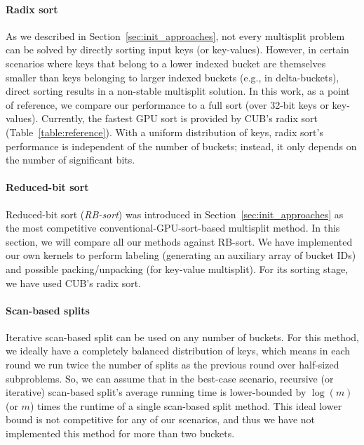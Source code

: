 \paragraph{Radix sort} As we described in Section~\ref{sec:init_approaches}, not every multisplit problem can be solved by directly sorting input keys (or key-values). However, in certain scenarios where keys that belong to a lower indexed bucket are themselves smaller than keys belonging to larger indexed buckets (e.g., in delta-buckets), direct sorting results in a non-stable multisplit solution.
In this work, as a point of reference, we compare our performance to a full sort (over 32-bit keys or key-values).
Currently, the fastest GPU sort is provided by CUB's radix sort (Table~\ref{table:reference}).
With a uniform distribution of keys, radix sort's performance is independent of the number of buckets; instead, it only depends on the number of significant bits.

\paragraph{Reduced-bit sort} Reduced-bit sort (\emph{RB-sort}) was introduced in Section~\ref{sec:init_approaches} as the most competitive conventional-GPU-sort-based multisplit method.
In this section, we will compare all our methods against RB-sort. We have implemented our own kernels to perform labeling (generating an auxiliary array of bucket IDs) and possible packing/unpacking (for key-value multisplit). For its sorting stage, we have used CUB's radix sort.

\paragraph{Scan-based splits}
Iterative scan-based split can be used on any number of buckets. For this method, we ideally have a completely balanced distribution of keys, which means in each round we run twice the number of splits as the previous round over half-sized subproblems.
So, we can assume that in the best-case scenario, recursive (or iterative) scan-based split's average running time is lower-bounded by $\log(m)$ (or $m$) times the runtime of a single scan-based split method. This ideal lower bound is not competitive for any of our scenarios, and thus we have not implemented this method for more than two buckets.

